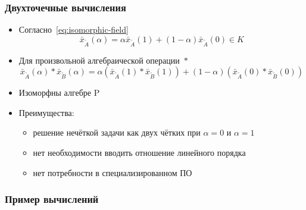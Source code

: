 \documentclass[12pt]{beamer}
\begin{document}
\begin{frame}
  \frametitle{Двухточечные вычисления}
  \begin{itemize}
    \item Согласно~\eqref{eq:isomorphic-field}
      \begin{equation}
        \label{eq:isomorphic-field-shortened}
        \bar{x}_{\tilde A}\left( \alpha \right)=\alpha \bar{x}_{\tilde A}\left( 1 \right)+\left( 1-\alpha  \right) \bar{x}_{\tilde A}\left( 0 \right) \in K
      \end{equation}
    \item Для произвольной алгебраической операции~$*$
      \begin{equation}
      \label{eq:two-point-calculations}
        \bar{x}_{\tilde A}\left( \alpha \right)*\bar{x}_{\tilde B}\left(\alpha \right)=\alpha \left(\bar{x}_{\tilde A}\left( 1 \right)*\bar{x}_{\tilde B}\left(1 \right) \right)+\left(1-\alpha \right)\left(\bar{x}_{\tilde A}\left(0 \right)*\bar{x}_{\tilde B}\left(0 \right) \right)
      \end{equation}
    \item Изоморфны алгебре P
    \item Преимущества:
      \begin{itemize}
        \item решение нечёткой задачи как двух чётких при $\alpha=0$ и $\alpha=1$
        \item нет необходимости вводить отношение линейного порядка
        \item нет потребности в специализированном ПО
      \end{itemize}
  \end{itemize}
\end{frame}


\begin{frame}
  \frametitle{Пример вычислений}
\end{frame}

\end{document}
